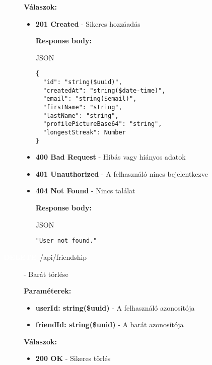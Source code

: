 \documentclass[12pt]{report}
\newcommand{\httpDelete}[1]{\colorbox{deleteColor}{\textbf{\textcolor{white}{DELETE}}}~#1}
\begin{document}
\begin{description}
    \vspace{0.5cm}
    \textbf{Válaszok:}
    \begin{itemize}
      \item \textbf{201 Created} - Sikeres hozzáadás

        \textbf{Response body:}
        \begin{codeblock}{JSON}
          \begin{verbatim}
{
  "id": "string($uuid)",
  "createdAt": "string($date-time)",
  "email": "string($email)",
  "firstName": "string",
  "lastName": "string",
  "profilePictureBase64": "string",
  "longestStreak": Number
}
          \end{verbatim}
        \end{codeblock}

      \item \textbf{400 Bad Request} - Hibás vagy hiányos adatok

      \item \textbf{401 Unauthorized} - A felhasználó nincs bejelentkezve

      \item \textbf{404 Not Found} - Nincs találat

        \textbf{Response body:}
        \begin{codeblock}{JSON}
          \begin{verbatim}
"User not found."
          \end{verbatim}
        \end{codeblock}
    \end{itemize}

  \item[\httpDelete{/api/friendship}] - Barát törlése
  
    \vspace{0.5cm}
    \textbf{Paraméterek:}
    \begin{itemize}
      \item \textbf{userId: string(\$uuid)} - A felhasználó azonosítója
      \item \textbf{friendId: string(\$uuid)} - A barát azonosítója
    \end{itemize}

    \vspace{0.5cm}
    \textbf{Válaszok:}
    \begin{itemize}
      \item \textbf{200 OK} - Sikeres törlés


\end{itemize}
\end{description}
\end{document}
